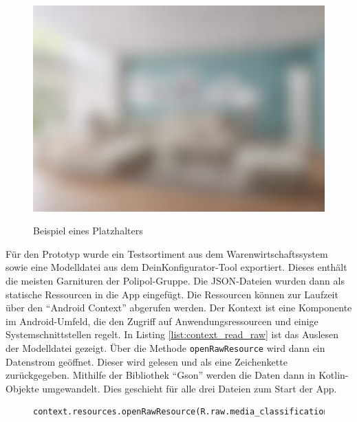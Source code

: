 \begin{figure}[!htb]
    \centering
    \begin{minipage}[t]{.3\textwidth}
        \caption{Beispiel eines Platzhalters}
        \includegraphics[width=1\textwidth]{img/Placeholder.jpg}\\
        \label{fig:placeholder}
    \end{minipage}
\end{figure}

Für den Prototyp wurde ein Testsortiment aus dem Warenwirtschaftssystem sowie eine Modelldatei aus dem DeinKonfigurator-Tool exportiert. Dieses enthält die meisten Garnituren der Polipol-Gruppe. Die \gls{JSON}-Dateien wurden dann als statische Ressourcen in die App eingefügt. Die Ressourcen können zur Laufzeit über den \enquote{Android Context} abgerufen werden. Der Kontext ist eine Komponente im Android-Umfeld, die den Zugriff auf Anwendungsressourcen und einige Systemschnittstellen regelt. In Listing \ref{list:context_read_raw} ist das Auslesen der Modelldatei gezeigt. Über die Methode \texttt{openRawResource} wird dann ein Datenstrom geöffnet. Dieser wird gelesen und als eine Zeichenkette zurückgegeben. Mithilfe der Bibliothek \enquote{Gson} werden die Daten dann in Kotlin-Objekte umgewandelt. Dies geschieht für alle drei Dateien zum Start der App.

\begin{figure}[!htb]
    \begin{lstlisting}[caption=Auslesen einer Ressource im Textformat über den Android Kontext, label=list:context_read_raw]
context.resources.openRawResource(R.raw.media_classification).bufferedReader().use(BufferedReader::readText)
    \end{lstlisting}
\end{figure}


